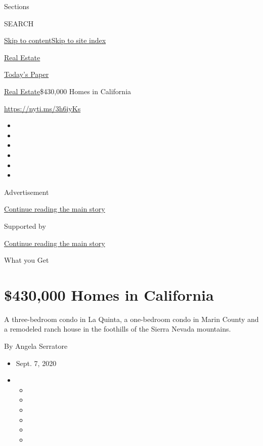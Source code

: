 Sections

SEARCH

\protect\hyperlink{site-content}{Skip to
content}\protect\hyperlink{site-index}{Skip to site index}

\href{https://www.nytimes3xbfgragh.onion/section/realestate}{Real
Estate}

\href{https://myaccount.nytimes3xbfgragh.onion/auth/login?response_type=cookie\&client_id=vi}{}

\href{https://www.nytimes3xbfgragh.onion/section/todayspaper}{Today's
Paper}

\href{/section/realestate}{Real Estate}\textbar{}\$430,000 Homes in
California

\url{https://nyti.ms/3h6iyKs}

\begin{itemize}
\item
\item
\item
\item
\item
\item
\end{itemize}

Advertisement

\protect\hyperlink{after-top}{Continue reading the main story}

Supported by

\protect\hyperlink{after-sponsor}{Continue reading the main story}

What you Get

\hypertarget{430000-homes-in-california}{%
\section{\$430,000 Homes in
California}\label{430000-homes-in-california}}

A three-bedroom condo in La Quinta, a one-bedroom condo in Marin County
and a remodeled ranch house in the foothills of the Sierra Nevada
mountains.

By Angela Serratore

\begin{itemize}
\item
  Sept. 7, 2020
\item
  \begin{itemize}
  \item
  \item
  \item
  \item
  \item
  \item
  \end{itemize}
\end{itemize}

